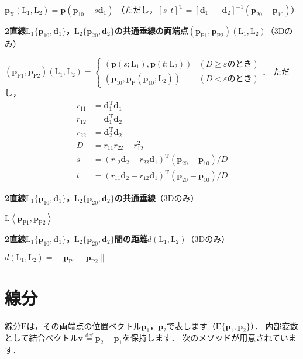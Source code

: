 ﻿\documentclass[a4paper]{jsarticle}
\begin{document}
$\bm{p}_{\mathrm{X}}(\mathrm{L}_{1},\mathrm{L}_{2})=\bm{p}(\bm{p}_{10}+s\bm{d}_{1})$
（ただし，$[s~~t]^{\mathrm{T}}=\left[\bm{d}_{1}~~-\bm{d}_{2}\right]^{-1}(\bm{p}_{20}-\bm{p}_{10})$）

{\bf 2直線$\mathrm{L}_{1}\{\bm{p}_{10},\bm{d}_{1}\}$，$\mathrm{L}_{2}\{\bm{p}_{20},\bm{d}_{2}\}$の共通垂線の両端点$(\bm{p}_{\mathrm{P}1}, \bm{p}_{\mathrm{P}2})(\mathrm{L}_{1},\mathrm{L}_{2})$}（3Dのみ）

$(\bm{p}_{\mathrm{P}1}, \bm{p}_{\mathrm{P}2})(\mathrm{L}_{1},\mathrm{L}_{2})=\begin{cases}
(\bm{p}(s;\mathrm{L}_{1}),\bm{p}(t;\mathrm{L}_{2})) & (D\geq\varepsilon\mbox{のとき}) \\
(\bm{p}_{10},\bm{p}_{\mathrm{P}}(\bm{p}_{10};\mathrm{L}_{2})) & (D<\varepsilon\mbox{のとき})
\end{cases}$．
ただし，
\begin{align*}
r_{11}&=\bm{d}_{1}^{\mathrm{T}}\bm{d}_{1} \\
r_{12}&=\bm{d}_{1}^{\mathrm{T}}\bm{d}_{2} \\
r_{22}&=\bm{d}_{2}^{\mathrm{T}}\bm{d}_{2} \\
D&=r_{11}r_{22}-r_{12}^{2} \\
s&=(r_{12}\bm{d}_{2}-r_{22}\bm{d}_{1})^{\mathrm{T}}(\bm{p}_{20}-\bm{p}_{10})/D \\
t&=(r_{11}\bm{d}_{2}-r_{12}\bm{d}_{1})^{\mathrm{T}}(\bm{p}_{20}-\bm{p}_{10})/D
\end{align*}

{\bf 2直線$\mathrm{L}_{1}\{\bm{p}_{10},\bm{d}_{1}\}$，$\mathrm{L}_{2}\{\bm{p}_{20},\bm{d}_{2}\}$の共通垂線}（3Dのみ）

$\mathrm{L}\left<\bm{p}_{\mathrm{P}1},\bm{p}_{\mathrm{P}2}\right>$

{\bf 2直線$\mathrm{L}_{1}\{\bm{p}_{10},\bm{d}_{1}\}$，$\mathrm{L}_{2}\{\bm{p}_{20},\bm{d}_{2}\}$間の距離$d(\mathrm{L}_{1},\mathrm{L}_{2})$}（3Dのみ）

$d(\mathrm{L}_{1},\mathrm{L}_{2})=\|\bm{p}_{\mathrm{P}1}-\bm{p}_{\mathrm{P}2}\|$


\section{線分}

線分$\mathrm{E}$は，その両端点の位置ベクトル$\bm{p}_{1}$，$\bm{p}_{2}$で表します（$\mathrm{E}\{\bm{p}_{1},\bm{p}_{2}\}$）．
内部変数として結合ベクトル$\bm{v}\overset{\mathrm{def}}{=}\bm{p}_{2}-\bm{p}_{1}$を保持します．
次のメソッドが用意されています．
\end{document}

